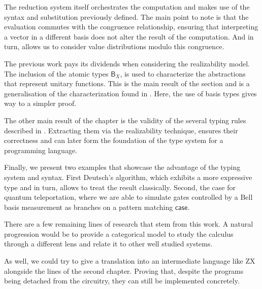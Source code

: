 \documentclass[runningheads,orivec,envcountsame,envcountsect]{llncs}
\newcommand\basis[1]{\ensuremath{\mathsf{B}_{#1}}}
\begin{document}
The reduction system itself orchestrates the computation and makes use of the syntax and substitution previously defined. The main point to note is that the evaluation commutes with the congruence relationship, ensuring that interpreting a vector in a different basis does not alter the result of the computation. And in turn, allows us to consider value distributions modulo this congruence.

The previous work pays its dividends when considering the realizability model. The inclusion of the atomic types $\basis{X}$, is used to characterize the abstractions that represent unitary functions. This is the main result of the section and is a generalisation of the characterization found in \cite{DiazcaroGuillermoMiquelValironLICS19}. Here, the use of basis types gives way to a simpler proof. 

The other main result of the chapter is the validity of the several typing rules described in . Extracting them via the realizability technique, ensures their correctness and can later form the foundation of the type system for a programming language.

Finally, we present two examples that showcase the advantage of the typing system and syntax. First Deutsch's algorithm, which exhibits a more expressive type and in turn, allows to treat the result classically. Second, the case for quantum teleportation, where we are able to simulate gates controlled by a Bell basis measurement as branches on a pattern matching $\mathsf{case}$. 

There are a few remaining lines of research that stem from this work. A natural progression would be to provide a categorical model to study the calculus through a different lens and relate it to other well studied systems. 

As well, we could try to give a translation into an intermediate language like ZX alongside the lines of the second chapter. Proving that, despite the programs being detached from the circuitry, they can still be  implemented concretely.

\end{document}
